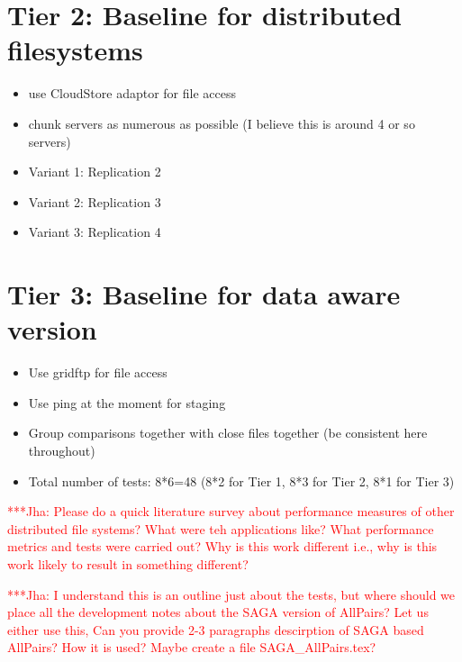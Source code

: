 \documentclass[a4paper,12pt]{article}
\newcommand{\jhanote}[1]{ {\textcolor{red} { ***Jha: #1 }}}
\newcommand{\jhanote}[1]{}
\begin{document}
\section{Tier 2: Baseline for distributed filesystems}
\begin{itemize}
\item use CloudStore adaptor for file access
\item chunk servers as numerous as possible (I believe this is around 4 or so servers)
\item Variant 1: Replication 2
\item Variant 2: Replication 3
\item Variant 3: Replication 4
\end{itemize}

\section{Tier 3: Baseline for data aware version}
\begin{itemize}
\item Use gridftp for file access
\item Use ping at the moment for staging
\item Group comparisons together with close files together (be consistent here throughout)
\item Total number of tests: 8*6=48 (8*2 for Tier 1, 8*3 for Tier 2, 8*1 for Tier 3)
\end{itemize}

\jhanote{Please do a quick literature survey about performance measures
of other distributed file systems? What were teh applications like? What
performance metrics and tests were carried out? Why is this work 
different i.e., why is this work likely to result in something different?}

\jhanote{I understand this is an outline just about the tests, but where should we place all the development notes about the SAGA version of AllPairs? Let us either use this, Can you provide 2-3 paragraphs descirption of SAGA based AllPairs? How it is used? Maybe create a file SAGA\_AllPairs.tex? }
\end{document}

